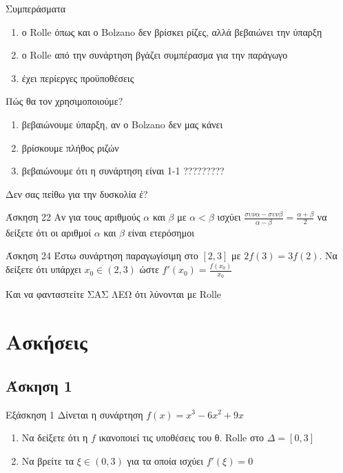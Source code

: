 \documentclass[greek]{beamer}
\begin{document}
\begin{frame}{Συμπεράσματα}
  \begin{enumerate}
    \item<1-> ο Rolle όπως και ο Bolzano δεν βρίσκει ρίζες, αλλά βεβαιώνει την ύπαρξη
    \item<2-> ο Rolle από την συνάρτηση βγάζει συμπέρασμα για την παράγωγο
    \item<3-> έχει περίεργες προϋποθέσεις
  \end{enumerate}
\end{frame}

\begin{frame}{Πώς θα τον χρησιμοποιούμε?}
  \begin{enumerate}
    \item<1-> βεβαιώνουμε ύπαρξη, αν ο Bolzano δεν μας κάνει
    \item<2-> βρίσκουμε πλήθος ριζών
    \item<3-> βεβαιώνουμε ότι η συνάρτηση είναι 1-1 ?????????
  \end{enumerate}
\end{frame}

\begin{frame}{Δεν σας πείθω για την δυσκολία έ?}
  \begin{block}{Άσκηση 22}
    Αν για τους αριθμούς $α$ και $β$ με $α<β$ ισχύει $\frac{συνα-συνβ}{α-β}=\frac{α+β}{2}$ να δείξετε ότι οι αριθμοί $α$ και $β$ είναι ετερόσημοι
  \end{block}
  \begin{block}{Άσκηση 24}
    Έστω συνάρτηση παραγωγίσιμη στο $[2,3]$ με $2f(3)=3f(2)$. Να δείξετε ότι υπάρχει $x_0\in (2,3)$ ώστε $f'(x_0)=\frac{f(x_0)}{x_0}$
  \end{block}
   Και να φανταστείτε ΣΑΣ ΛΕΩ ότι λύνονται με Rolle
\end{frame}

\section{Ασκήσεις}
\subsection{Άσκηση 1}
\begin{frame}[label=Άσκηση1]{Εξάσκηση 1}
  Δίνεται η συνάρτηση $f(x)=x^3-6x^2+9x$
  \begin{enumerate}
    \item<1-> Να δείξετε ότι η $f$ ικανοποιεί τις υποθέσεις του θ. Rolle στο $Δ=[0,3]$
    \item<2-> Να βρείτε τα $ξ\in(0,3)$ για τα οποία ισχύει $f'(ξ)=0$
  \end{enumerate}
\end{frame}
\end{document}
